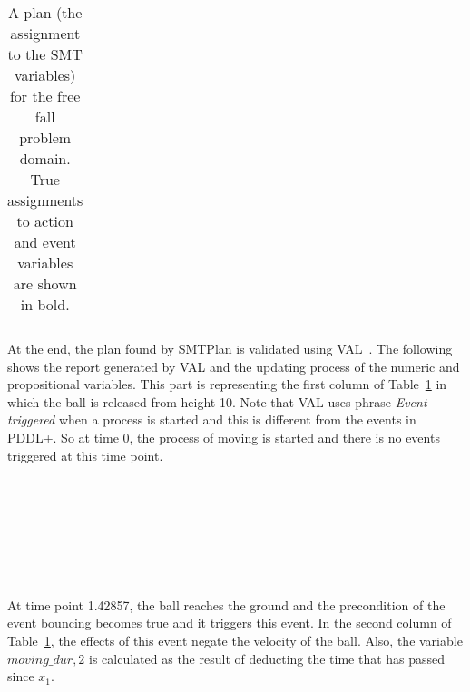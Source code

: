 \begin{table}[htb]
\begin{tabular}{|>{$}l<{$} | >{$}l<{$}| >{$}l<{$} |}
\\ \hline
\end{tabular}
\caption{A plan (the assignment to the SMT variables) for the free fall problem domain. True assignments to action and event variables are shown in bold.}
\label{tab:free fall example}
\end{table}


At the end, the plan found by SMTPlan is validated using VAL~\cite{howey2004val}. The following shows the report generated by VAL and the updating process of the numeric and propositional variables. This part is representing the first column of Table~\ref{tab:free fall example} in which the ball is released from height 10. Note that VAL uses phrase \emph{Event triggered} when a process is started and this is different from the events in PDDL+. So at time 0, the process of moving is started and there is no events triggered at this time point.
\begin{tabbing}
\headingtimedetails 
\\
 \> \\
\\
  \> \eventtriggered \\
\> \\
\\
\end{tabbing}

At time point 1.42857, the ball reaches the ground and the precondition of the event bouncing becomes true and it triggers this event. In the second column of Table~\ref{tab:free fall example}, the effects of this event negate the velocity of the ball. Also, the variable $moving\_{dur,2}$ is calculated as the result of deducting the time that has passed since $x_1$.

\begin{tabbing}
\headingtimedetails 
  \> \\
 \> \\
 \> \\
 \> \\
\\
  \> \eventtriggered \\
\> \\
 \> \\
 \> \\
\\
\end{tabbing}

